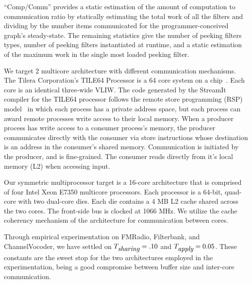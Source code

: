 \noindent ``Comp/Comm'' provides a static estimation of the
amount of computation to communication ratio by statically estimating the total
work of all the filters and dividing by the number items communicated
for the programmer-conceived graph's steady-state.  The remaining
statistics give the number of peeking filters types, number of peeking
filters instantiated at runtime, and a static estimation of the maximum
work in the single most loaded peeking filter.

We target 2 multicore architecture with different communication
mechanisms.  The Tilera Corporation's TILE64 Processor is a 64 core
system on a chip~\cite{tilera}.  Each core is an identical three-wide
VLIW. The code generated by the StreamIt
compiler for the TILE64 processor follows the remote store programming
(RSP) model~\cite{rsp10} in which each process has a private address
space, but each process can award remote processes write access to
their local memory. When a producer process has write access to a
consumer process's memory, the producer communicates directly with the
consumer via store instructions whose destination is an address in the
consumer's shared memory.  Communication is initiated by the producer,
and is fine-grained.  The consumer reads directly from it's local
memory (L2) when accessing input.

Our symmetric multiprocessor target is a 16-core architecture that is
comprised of four Intel Xeon E7350 multicore processors.  Each processor
is a 64-bit, quad-core with two dual-core dies.  Each die contains a 4
MB L2 cache shared across the two cores.  The front-side bus is clocked
at 1066 MHz.  We utilize the cache coherency mechanism of the
architecture for communication between cores. 

Through empirical experimentation on FMRadio, Filterbank, and
ChannelVocoder, we have settled on $T_{\mbox{\it sharing}} =.10$ and
$T_{\mbox{\it apply}} = 0.05$. These constants are the sweet stop for the two
architectures employed in the experimentation, being a good compromise
between buffer size and inter-core communication.



